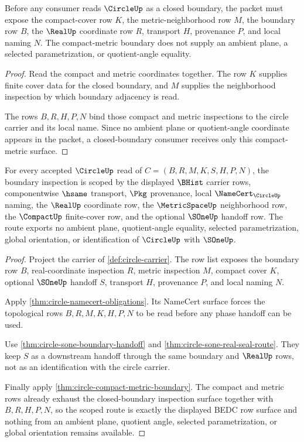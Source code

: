 \begin{theorem}
\label{thm:circle-compact-metric-boundary}
Before any consumer reads $\CircleUp$ as a closed boundary, the packet must expose the compact-cover row $K$, the metric-neighborhood row $M$, the boundary row $B$, the $\RealUp$ coordinate row $R$, transport $H$, provenance $P$, and local naming $N$. The compact-metric boundary does not supply an ambient plane, a selected parametrization, or quotient-angle equality.
\end{theorem}
\begin{proof}
Read the compact and metric coordinates together. The row $K$ supplies finite cover data for the closed boundary, and $M$ supplies the neighborhood inspection by which boundary adjacency is read.

The rows $B,R,H,P,N$ bind those compact and metric inspections to the circle carrier and its local name. Since no ambient plane or quotient-angle coordinate appears in the packet, a closed-boundary consumer receives only this compact-metric surface.
\end{proof}

\begin{theorem}
\label{thm:circle-real-metric-scope-route}
For every accepted $\CircleUp$ read of $C=(B,R,M,K,S,H,P,N)$, the boundary inspection is scoped by the displayed $\BHist$ carrier rows, componentwise $\hsame$ transport, $\Pkg$ provenance, local $\NameCert_{\CircleUp}$ naming, the $\RealUp$ coordinate row, the $\MetricSpaceUp$ neighborhood row, the $\CompactUp$ finite-cover row, and the optional $\SOneUp$ handoff row. The route exports no ambient plane, quotient-angle equality, selected parametrization, global orientation, or identification of $\CircleUp$ with $\SOneUp$.
\end{theorem}
\begin{proof}
Project the carrier of \autoref{def:circle-carrier}. The row list exposes the boundary row $B$, real-coordinate inspection $R$, metric inspection $M$, compact cover $K$, optional $\SOneUp$ handoff $S$, transport $H$, provenance $P$, and local naming $N$.

Apply \autoref{thm:circle-namecert-obligations}. Its NameCert surface forces the topological rows $B,R,M,K,H,P,N$ to be read before any phase handoff can be used.

Use \autoref{thm:circle-sone-boundary-handoff} and \autoref{thm:circle-sone-real-seal-route}. They keep $S$ as a downstream handoff through the same boundary and $\RealUp$ rows, not as an identification with the circle carrier.

Finally apply \autoref{thm:circle-compact-metric-boundary}. The compact and metric rows already exhaust the closed-boundary inspection surface together with $B,R,H,P,N$, so the scoped route is exactly the displayed BEDC row surface and nothing from an ambient plane, quotient angle, selected parametrization, or global orientation remains available.
\end{proof}

